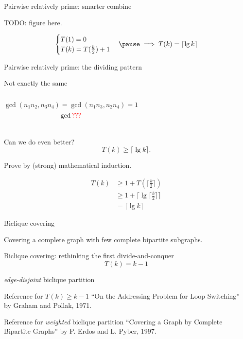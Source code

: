 \begin{frame}{Pairwise relatively prime: smarter combine}
  \centerline{TODO: figure here.}

  \begin{equation*}
	\begin{cases}
	  T(1) = 0 \\
	  T(k) = T(\frac{k}{2}) + 1
	\end{cases}\pause \implies T(k) = \lceil \lg k \rceil
  \end{equation*}
\end{frame}
\begin{frame}{Pairwise relatively prime: the dividing pattern}
\end{frame}
\begin{frame}{Not exactly the same}
  \begin{columns}
	  
	  \[
		\gcd(n_1n_2, n_3n_4) = \gcd(n_1n_3, n_2n_4) = 1
	  \]
	  \[
		\gcd{} \textcolor{red}{???}
	  \]
  \end{columns}
\end{frame}
\begin{frame}{Can we do even better?}
  \[
	T(k) \ge \lceil \lg k \rceil.
  \]

  \pause
  \centerline{Prove by (strong) mathematical induction.}

  \pause
  \begin{align*}
	T(k) &\ge 1 + T(\lceil \frac{k}{2} \rceil) \\
		&\ge 1 + \lceil \lg \lceil \frac{k}{2} \rceil \rceil \\
		&= \lceil \lg k \rceil
  \end{align*}
\end{frame}
\begin{frame}{Biclique covering}
  \centerline{Covering a complete graph with few complete bipartite subgraphs.}

\end{frame}
\begin{frame}{Biclique covering: rethinking the first divide-and-conquer}
  \[
	T(k) = k-1
  \]

  \pause
  \centerline{\emph{edge-disjoint} biclique partition}

  \pause
  \vspace{0.20cm}
  \begin{alertblock}{Reference for $T(k) \ge k-1$}
	``On the Addressing Problem for Loop Switching'' by Graham and Pollak, 1971. 
  \end{alertblock}

  \pause
  \vspace{0.30cm}
  \begin{alertblock}{Reference for \emph{weighted} biclique partition}
	``Covering a Graph by Complete Bipartite Graphs'' by P. Erdos and L. Pyber, 1997.
  \end{alertblock}
\end{frame}
